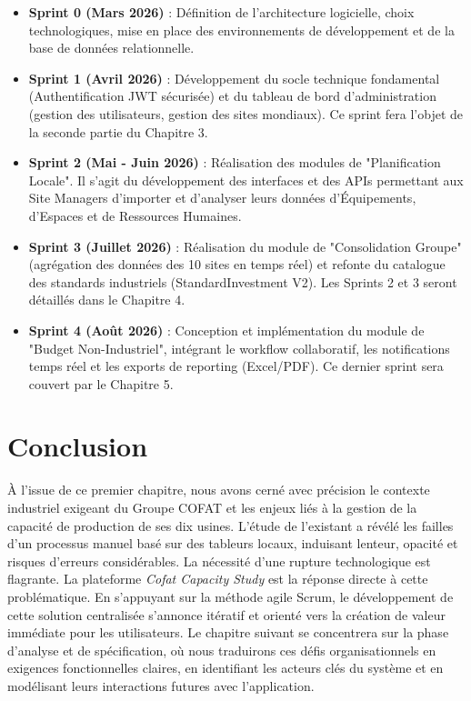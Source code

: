 \begin{itemize}
    \item \textbf{Sprint 0 (Mars 2026)} : Définition de l'architecture logicielle, choix technologiques, mise en place des environnements de développement et de la base de données relationnelle.
    \item \textbf{Sprint 1 (Avril 2026)} : Développement du socle technique fondamental (Authentification JWT sécurisée) et du tableau de bord d'administration (gestion des utilisateurs, gestion des sites mondiaux). Ce sprint fera l'objet de la seconde partie du Chapitre 3.
    \item \textbf{Sprint 2 (Mai - Juin 2026)} : Réalisation des modules de "Planification Locale". Il s'agit du développement des interfaces et des APIs permettant aux Site Managers d'importer et d'analyser leurs données d'Équipements, d'Espaces et de Ressources Humaines. 
    \item \textbf{Sprint 3 (Juillet 2026)} : Réalisation du module de "Consolidation Groupe" (agrégation des données des 10 sites en temps réel) et refonte du catalogue des standards industriels (StandardInvestment V2). Les Sprints 2 et 3 seront détaillés dans le Chapitre 4.
    \item \textbf{Sprint 4 (Août 2026)} : Conception et implémentation du module de "Budget Non-Industriel", intégrant le workflow collaboratif, les notifications temps réel et les exports de reporting (Excel/PDF). Ce dernier sprint sera couvert par le Chapitre 5.
\end{itemize}

\section{Conclusion}
À l'issue de ce premier chapitre, nous avons cerné avec précision le contexte industriel exigeant du Groupe COFAT et les enjeux liés à la gestion de la capacité de production de ses dix usines. L'étude de l'existant a révélé les failles d'un processus manuel basé sur des tableurs locaux, induisant lenteur, opacité et risques d'erreurs considérables. La nécessité d'une rupture technologique est flagrante. La plateforme \textit{Cofat Capacity Study} est la réponse directe à cette problématique. En s'appuyant sur la méthode agile Scrum, le développement de cette solution centralisée s'annonce itératif et orienté vers la création de valeur immédiate pour les utilisateurs. 
Le chapitre suivant se concentrera sur la phase d'analyse et de spécification, où nous traduirons ces défis organisationnels en exigences fonctionnelles claires, en identifiant les acteurs clés du système et en modélisant leurs interactions futures avec l'application.
